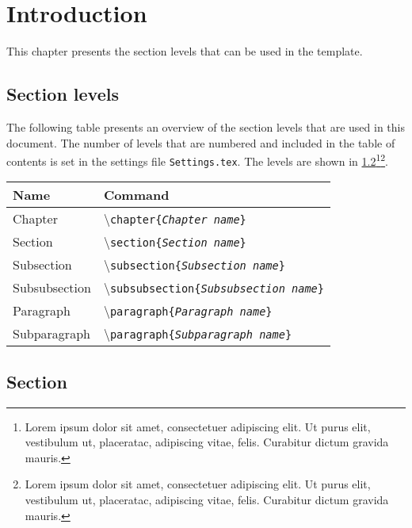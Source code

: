 \chapter{Introduction}
This chapter presents the section levels that can be used in the template.

\section{Section levels}
The following table presents an overview of the section levels that are used in
this document. The number of levels that are numbered and included in the table
of contents is set in the settings file \texttt{Settings.tex}. The levels are
shown in \cref{sec:introduction_section}\footnote{ Lorem ipsum dolor sit amet,
	consectetuer adipiscing elit. Ut purus elit, vestibulum ut, placeratac,
	adipiscing vitae, felis. Curabitur dictum gravida
	mauris.}\footnotemarksep\footnote{Lorem ipsum dolor sit amet, consectetuer
	adipiscing elit. Ut purus elit, vestibulum ut, placeratac, adipiscing vitae,
	felis. Curabitur dictum gravida mauris.}.%

\begin{table}[H]
	\centering
	\begin{tabular}{ll}
		\toprule
		Name          & Command                                                           \\ \midrule
		Chapter       & \textbackslash\texttt{chapter\{\emph{Chapter name}\}}             \\
		Section       & \textbackslash\texttt{section\{\emph{Section name}\}}             \\
		Subsection    & \textbackslash\texttt{subsection\{\emph{Subsection name}\}}       \\
		Subsubsection & \textbackslash\texttt{subsubsection\{\emph{Subsubsection name}\}} \\
		Paragraph     & \textbackslash\texttt{paragraph\{\emph{Paragraph name}\}}         \\
		Subparagraph  & \textbackslash\texttt{paragraph\{\emph{Subparagraph name}\}}      \\
		\bottomrule
	\end{tabular}
\end{table}


\section{Section} \label{sec:introduction_section}
